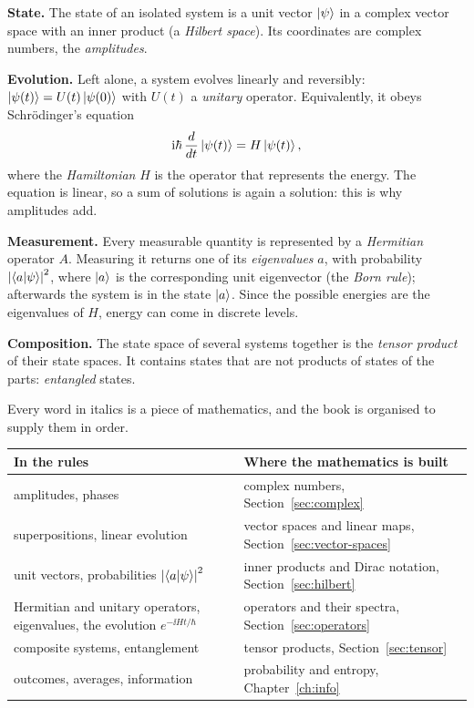 \begin{stepsn}
  \item \textbf{State.} The state of an isolated system is a unit vector $\left|\psi\right\rangle$ in a complex vector space with an inner product (a \emph{Hilbert space}). Its coordinates are complex numbers, the \emph{amplitudes}.
  \item \textbf{Evolution.} Left alone, a system evolves linearly and reversibly: $\left|\psi(t)\right\rangle=U(t)\left|\psi(0)\right\rangle$ with $U(t)$ a \emph{unitary} operator. Equivalently, it obeys Schr\"odinger's equation
    \[
      \mathrm{i}\hbar\,\frac{d}{dt}\left|\psi(t)\right\rangle=H\left|\psi(t)\right\rangle,
    \]
    where the \emph{Hamiltonian} $H$ is the operator that represents the energy. The equation is linear, so a sum of solutions is again a solution: this is why amplitudes add.
  \item \textbf{Measurement.} Every measurable quantity is represented by a \emph{Hermitian} operator $A$. Measuring it returns one of its \emph{eigenvalues} $a$, with probability $\left|\left\langle a\middle|\psi\right\rangle\right|^2$, where $\left|a\right\rangle$ is the corresponding unit eigenvector (the \emph{Born rule}); afterwards the system is in the state $\left|a\right\rangle$. Since the possible energies are the eigenvalues of $H$, energy can come in discrete levels.
  \item \textbf{Composition.} The state space of several systems together is the \emph{tensor product} of their state spaces. It contains states that are not products of states of the parts: \emph{entangled} states.
\end{stepsn}

Every word in italics is a piece of mathematics, and the book is organised to supply them in order.

\begin{center}
\small
\begin{tabular}{@{}>{\raggedright\arraybackslash}p{}>{\raggedright\arraybackslash}p{}@{}}
  \toprule
  In the rules & Where the mathematics is built\\
  \midrule
  amplitudes, phases & complex numbers, Section~\ref{sec:complex}\\
  superpositions, linear evolution & vector spaces and linear maps, Section~\ref{sec:vector-spaces}\\
  unit vectors, probabilities $\left|\left\langle a\middle|\psi\right\rangle\right|^2$ & inner products and Dirac notation, Section~\ref{sec:hilbert}\\
  Hermitian and unitary operators, eigenvalues, the evolution $e^{-\ii Ht/\hbar}$ & operators and their spectra, Section~\ref{sec:operators}\\
  composite systems, entanglement & tensor products, Section~\ref{sec:tensor}\\
  outcomes, averages, information & probability and entropy, Chapter~\ref{ch:info}\\
  \bottomrule
\end{tabular}
\end{center}


